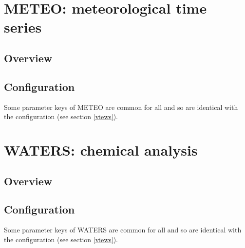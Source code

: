 


\section{METEO: meteorological time series}

\subsection{Overview}

\subsection{Configuration}

Some parameter keys of METEO are common for all  and  so are identical with the  configuration (see section \ref{views}).




\section{WATERS: chemical analysis}

\subsection{Overview}

\subsection{Configuration}

Some parameter keys of WATERS are common for all  and  so are identical with the  configuration (see section \ref{views}).





